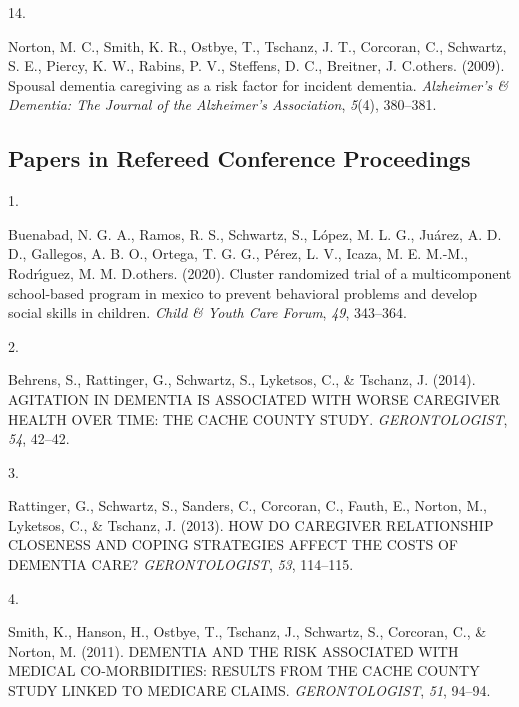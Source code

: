 \documentclass[11pt,a4paper,]{moderncv}
\newlength{\csllabelwidth}
\newcommand{\CSLLeftMargin}[1]{\parbox[t]{\csllabelwidth}{#1}}
\newcommand{\CSLRightInline}[1]{\parbox[t]{\linewidth - \csllabelwidth}{#1}}
\begin{document}
\leavevmode{}%
\CSLLeftMargin{14. }
\CSLRightInline{Norton, M. C., Smith, K. R., Ostbye, T., Tschanz, J. T.,
Corcoran, C., Schwartz, S. E., Piercy, K. W., Rabins, P. V., Steffens,
D. C., Breitner, J. C.others. (2009). Spousal dementia caregiving as a
risk factor for incident dementia. \emph{Alzheimer's \& Dementia: The
Journal of the Alzheimer's Association}, \emph{5}(4), 380--381.}

\clearpage

\hypertarget{papers-in-refereed-conference-proceedings}{%
\subsection{\texorpdfstring{\textbf{Papers in Refereed Conference
Proceedings}}{Papers in Refereed Conference Proceedings}}\label{papers-in-refereed-conference-proceedings}}

\hypertarget{refs_proceedings}{}
\leavevmode{}%
\CSLLeftMargin{1. }
\CSLRightInline{Buenabad, N. G. A., Ramos, R. S., Schwartz, S., López,
M. L. G., Juárez, A. D. D., Gallegos, A. B. O., Ortega, T. G. G., Pérez,
L. V., Icaza, M. E. M.-M., Rodrı́guez, M. M. D.others. (2020). Cluster
randomized trial of a multicomponent school-based program in mexico to
prevent behavioral problems and develop social skills in children.
\emph{Child \& Youth Care Forum}, \emph{49}, 343--364.}

\leavevmode{}%
\CSLLeftMargin{2. }
\CSLRightInline{Behrens, S., Rattinger, G., Schwartz, S., Lyketsos, C.,
\& Tschanz, J. (2014). AGITATION IN DEMENTIA IS ASSOCIATED WITH WORSE
CAREGIVER HEALTH OVER TIME: THE CACHE COUNTY STUDY.
\emph{GERONTOLOGIST}, \emph{54}, 42--42.}

\leavevmode{}%
\CSLLeftMargin{3. }
\CSLRightInline{Rattinger, G., Schwartz, S., Sanders, C., Corcoran, C.,
Fauth, E., Norton, M., Lyketsos, C., \& Tschanz, J. (2013). HOW DO
CAREGIVER RELATIONSHIP CLOSENESS AND COPING STRATEGIES AFFECT THE COSTS
OF DEMENTIA CARE? \emph{GERONTOLOGIST}, \emph{53}, 114--115.}

\leavevmode{}%
\CSLLeftMargin{4. }
\CSLRightInline{Smith, K., Hanson, H., Ostbye, T., Tschanz, J.,
Schwartz, S., Corcoran, C., \& Norton, M. (2011). DEMENTIA AND THE RISK
ASSOCIATED WITH MEDICAL CO-MORBIDITIES: RESULTS FROM THE CACHE COUNTY
STUDY LINKED TO MEDICARE CLAIMS. \emph{GERONTOLOGIST}, \emph{51},
94--94.}
\end{document}
